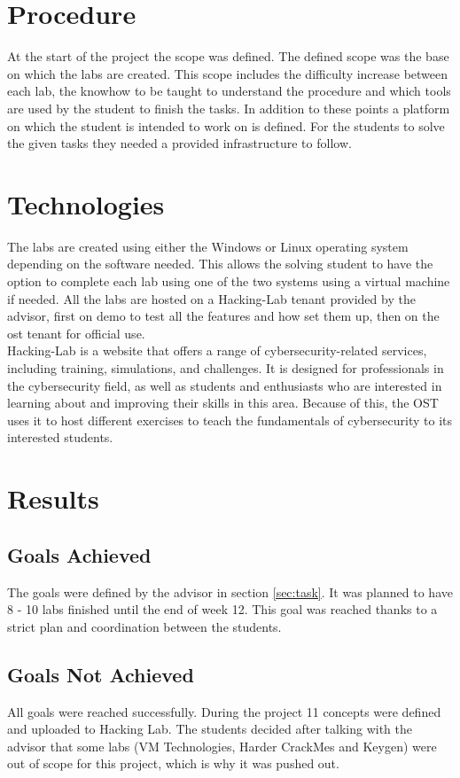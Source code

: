 \section{Procedure}
At the start of the project the scope was defined. The defined scope was the base on which the labs are created. This scope includes the difficulty increase between each lab, the knowhow to be taught to understand the procedure and which tools are used by the student to finish the tasks. In addition to these points a platform on which the student is intended to work on is defined.
For the students to solve the given tasks they needed a provided infrastructure to follow.

\section{Technologies}
The labs are created using either the Windows or Linux operating system depending on the software needed. This allows the solving student to have the option to complete each lab using one of the two systems using a virtual machine if needed. 
All the labs are hosted on a Hacking-Lab tenant provided by the advisor, first on demo to test all the features and how set them up, then on the ost tenant for official use. \\
Hacking-Lab is a website that offers a range of cybersecurity-related services, including training, simulations, and challenges. It is designed for professionals in the cybersecurity field, as well as students and enthusiasts who are interested in learning about and improving their skills in this area.
Because of this, the OST uses it to host different exercises to teach the fundamentals of cybersecurity to its interested students.

\section{Results}
\subsection{Goals Achieved}
The goals were defined by the advisor in section \ref{sec:task}. It was planned to have 8 - 10 labs finished until the end of week 12. This goal was reached thanks to a strict plan and coordination between the students.

\subsection{Goals Not Achieved}
All goals were reached successfully. During the project 11 concepts were defined and uploaded to Hacking Lab. The students decided after talking with the advisor that some labs (VM Technologies, Harder CrackMes and Keygen) were out of scope for this project, which is why it was pushed out. 

